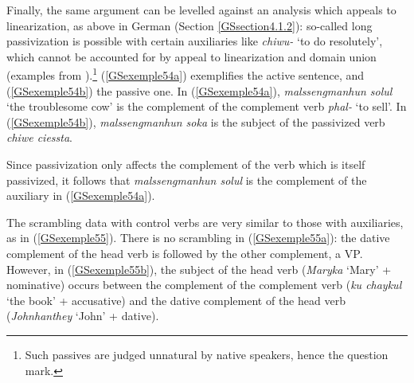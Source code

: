 {Finally, the same argument can be levelled against an analysis which appeals to linearization, as above in German (Section \ref{GSsection4.1.2}): so-called long passivization is possible with certain auxiliaries like \emph{chiwu-} `to do resolutely', which cannot be accounted for by appeal to linearization and domain union (examples from \citealt[164]{Chung98a-u}).\footnote{Such passives are judged unnatural by native speakers, hence the question mark.} (\ref{GSexemple54a}) exemplifies the active sentence, and (\ref{GSexemple54b}) the passive one. In (\ref{GSexemple54a}), \emph{malssengmanhun solul} `the troublesome cow' is the complement of the complement verb \emph{phal-} `to sell'. In (\ref{GSexemple54b}), \emph{malssengmanhun soka} is the subject of the passivized verb \emph{chiwe ciessta}.

\eal
	\label{GSexemple54} 
	\label{GSexemple54a}
		
	\label{GSexemple54b}
\zl

Since passivization only affects the complement of the verb which is itself passivized, it follows that \emph{malssengmanhun solul} is the complement of the auxiliary in (\ref{GSexemple54a}).

The scrambling data with control verbs are very similar to those with auxiliaries, as in (\ref{GSexemple55}). There is no scrambling in (\ref{GSexemple55a}): the dative complement of the head verb is followed
by the other complement, a VP. However, in (\ref{GSexemple55b}), the subject of the head verb
(\emph{Maryka} `Mary' + nominative) occurs between the complement of the complement verb (\emph{ku
  chaykul} `the book' + accusative) and the dative complement of the head verb (\emph{Johnhanthey} `John' + dative).

}
